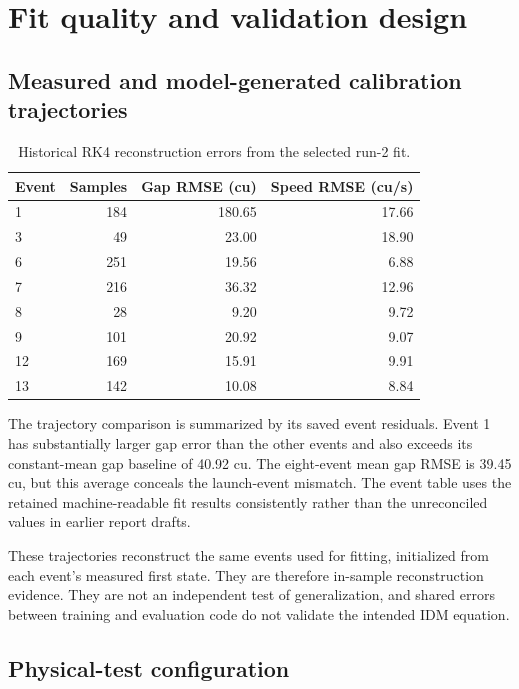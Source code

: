 \documentclass[11pt,a4paper]{article}
\begin{document}
\newpage

\section{Fit quality and validation design}

\subsection*{Measured and model-generated calibration trajectories}

\begin{table}[H]\centering\small
\caption{Historical RK4 reconstruction errors from the selected run-2 fit.}
\begin{tabular}{lrrr}
\toprule
Event & Samples & Gap RMSE (cu) & Speed RMSE (cu/s) \\
\midrule
1 & 184 & 180.65 & 17.66 \\
3 & 49 & 23.00 & 18.90 \\
6 & 251 & 19.56 & 6.88 \\
7 & 216 & 36.32 & 12.96 \\
8 & 28 & 9.20 & 9.72 \\
9 & 101 & 20.92 & 9.07 \\
12 & 169 & 15.91 & 9.91 \\
13 & 142 & 10.08 & 8.84 \\
\bottomrule\end{tabular}\end{table}

The trajectory comparison is summarized by its saved event residuals. Event 1 has substantially larger gap error than the other events and also exceeds its constant-mean gap baseline of 40.92 cu. The eight-event mean gap RMSE is 39.45 cu, but this average conceals the launch-event mismatch. The event table uses the retained machine-readable fit results consistently rather than the unreconciled values in earlier report drafts.


These trajectories reconstruct the same events used for fitting, initialized from each event's measured first state. They are therefore in-sample reconstruction evidence. They are not an independent test of generalization, and shared errors between training and evaluation code do not validate the intended IDM equation.


\subsection*{Physical-test configuration}
\end{document}
